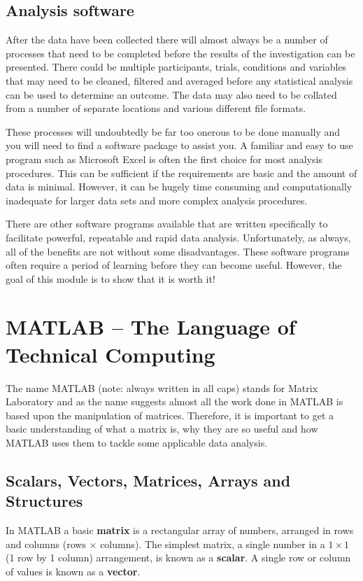 \documentclass[12pt,a4paper]{article}
\begin{document}
\subsection{Analysis software}
After the data have been collected there will almost always be a number of processes that need to be completed before the results of the investigation can be presented.  
There could be multiple participants, trials, conditions and variables that may need to be cleaned, filtered and averaged before any statistical analysis can be used to determine an outcome.  
The data may also need to be collated from a number of separate locations and various different file formats.

These processes will undoubtedly be far too onerous to be done manually and you will need to find a software package to assist you.  
A familiar and easy to use program such as Microsoft Excel is often the first choice for most analysis procedures.  
This can be sufficient if the requirements are basic and the amount of data is minimal.  
However, it can be hugely time consuming and computationally inadequate for larger data sets and more complex analysis procedures.

There are other software programs available that are written specifically to facilitate powerful, repeatable and rapid data analysis.  
Unfortunately, as always, all of the benefits are not without some disadvantages.  
These software programs often require a period of learning before they can become useful.  
However, the goal of this module is to show that it is worth it!

\section{MATLAB -- The Language of Technical Computing}
\label{sec:matrices}
The name MATLAB (note: always written in all caps) stands for Matrix Laboratory and as the name suggests almost all the work done in MATLAB is based upon the manipulation of matrices.  
Therefore, it is important to get a basic understanding of what a matrix is, why they are so useful and how MATLAB uses them to tackle some applicable data analysis.

\subsection{Scalars, Vectors, Matrices, Arrays and Structures}
In MATLAB a basic \textbf{matrix} is a rectangular array of numbers, arranged in rows and columns (rows $\times$ columns).  
The simplest matrix, a single number in a $1\times1$ (1 row by 1 column) arrangement, is known as a \textbf{scalar}.  
A single row or column of values is known as a \textbf{vector}.
\end{document}
